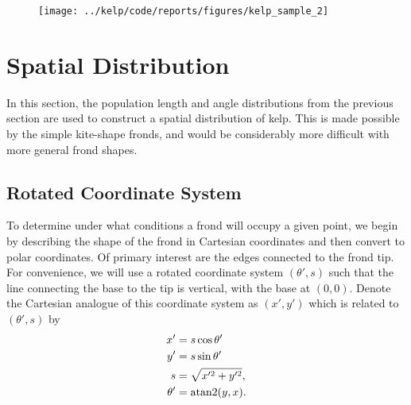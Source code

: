 \begin{figure}[h]
	\centering
	\texttt{[image: ../kelp/code/reports/figures/kelp\_sample\_2]}
	\label{fig:kelp_sample}
\end{figure}

\section{Spatial Distribution}
In this section, the population length and angle distributions from the previous section are used to construct a spatial distribution of kelp.
This is made possible by the simple kite-shape fronds, and would be considerably more difficult with more general frond shapes.
\subsection{Rotated Coordinate System}
\label{sec:rot_coords}
To determine under what conditions a frond will occupy a given point, we begin by
describing the shape of the frond in Cartesian coordinates and then convert to polar coordinates.
Of primary interest are the edges connected to the frond tip.
For convenience, we will use a rotated coordinate system $(\theta',s)$ such that the line connecting the base to the tip is vertical, with the base at $(0,0)$.
Denote the Cartesian analogue of this coordinate system as $(x',y')$ which is related to $(\theta',s)$ by
\begin{align*}
	x' &= s\cos\theta' \\ 
	y' &= s\sin\theta' \\
	s &= \sqrt{x'^2+y'^2}, \\
	\theta' &= \operatorname{atan2}(y, x).
\end{align*}

